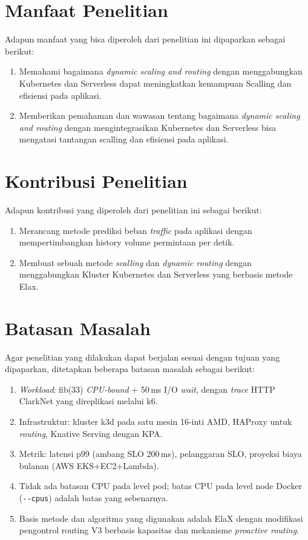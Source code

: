 \section{Manfaat Penelitian}
\label{sec:manfaat-penelitian}

Adapun manfaat yang bisa diperoleh dari penelitian ini dipaparkan sebagai berikut:

\begin{enumerate}
    \item Memahami bagaimana \emph{dynamic scaling and routing} dengan menggabungkan Kubernetes dan Serverless dapat meningkatkan kemampuan Scalling dan efisiensi pada aplikasi.
    \item Memberikan pemahaman dan wawasan tentang bagaimana \emph{dynamic scaling and routing} dengan mengintegrasikan Kubernetes dan Serverless bisa mengatasi tantangan scalling dan efisiensi pada aplikasi.
\end{enumerate}

\section{Kontribusi Penelitian}
\label{sec:kontribusi-penelitian}

Adapun kontribusi yang diperoleh dari penelitian ini sebagai berikut:

\begin{enumerate}
    \item Merancang metode prediksi beban \emph{traffic} pada aplikasi dengan mempertimbangkan history volume permintaan per detik.
    \item Membuat sebuah metode \emph{scalling} dan \emph{dynamic routing} dengan menggabungkan Kluster Kubernetes dan Serverless yang berbasis metode Elax.
\end{enumerate}

\section{Batasan Masalah}
\label{sec:batasan-masalah}

Agar penelitian yang dilakukan dapat berjalan sesuai dengan tujuan yang dipaparkan, ditetapkan beberapa batasan masalah sebagai berikut:

\begin{enumerate}
    \item \emph{Workload}: fib(33) \emph{CPU-bound} + 50\,ms I/O \emph{wait}, dengan \emph{trace} HTTP ClarkNet yang direplikasi melalui k6.
    \item Infrastruktur: kluster k3d pada satu mesin 16-inti AMD, HAProxy untuk \emph{routing}, Knative Serving dengan KPA.
    \item Metrik: latensi p99 (ambang SLO 200\,ms), pelanggaran SLO, proyeksi biaya bulanan (AWS EKS+EC2+Lambda).
    \item Tidak ada batasan CPU pada level pod; batas CPU pada level node Docker (\texttt{-{}-cpus}) adalah batas yang sebenarnya.
    \item Basis metode dan algoritma yang digunakan adalah ElaX dengan modifikasi pengontrol routing V3 berbasis kapasitas dan mekanisme \emph{proactive routing}.
\end{enumerate}
